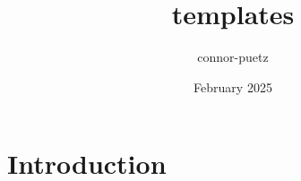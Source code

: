 \documentclass{article}
\title{templates}
\author{connor-puetz }
\date{February 2025}
\begin{document}
\maketitle

\section{Introduction}
\end{document}
